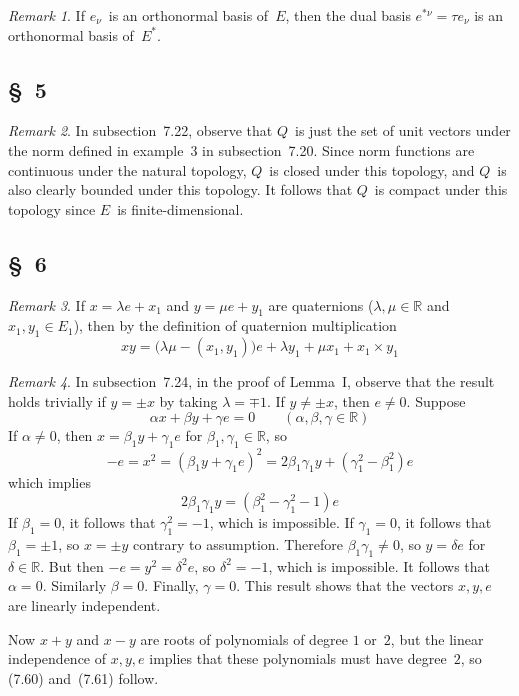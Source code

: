 \documentclass[letterpaper,12pt]{article}
\newcommand{\R}{\mathbb{R}}
\newcommand{\cross}{\times}
\newcommand{\iprod}[2]{(#1,#2)}
\theoremstyle{definition}
\theoremstyle{remark}
\newtheorem*{rmk}{Remark}
\begin{document}
\begin{rmk}
If \(e_{\nu}\)~is an orthonormal basis of~\(E\), then the dual basis \(e^{*\nu}=\tau e_{\nu}\) is an orthonormal basis of~\(E^*\).
\end{rmk}

\subsection*{\S~5}
\begin{rmk}
In subsection~7.22, observe that \(Q\)~is just the set of unit vectors under the norm defined in example~3 in subsection~7.20. Since norm functions are continuous under the natural topology, \(Q\)~is closed under this topology, and \(Q\)~is also clearly bounded under this topology. It follows that \(Q\)~is compact under this topology since \(E\)~is finite-dimensional.
\end{rmk}

\subsection*{\S~6}
\begin{rmk}
If \(x=\lambda e+x_1\) and \(y=\mu e+y_1\) are quaternions (\(\lambda,\mu\in\R\) and \(x_1,y_1\in E_1\)), then by the definition of quaternion multiplication
\[xy=\bigl(\lambda\mu-\iprod{x_1}{y_1}\bigr)e+\lambda y_1+\mu x_1+x_1\cross y_1\]
\end{rmk}

\begin{rmk}
In subsection~7.24, in the proof of Lemma~I, observe that the result holds trivially if \(y=\pm x\) by taking \(\lambda=\mp 1\). If \(y\ne\pm x\), then \(e\ne 0\). Suppose
\[\alpha x+\beta y+\gamma e=0\qquad(\alpha,\beta,\gamma\in\R)\]
If \(\alpha\ne 0\), then \(x=\beta_1y+\gamma_1e\) for \(\beta_1,\gamma_1\in\R\), so
\[-e=x^2=(\beta_1y+\gamma_1e)^2=2\beta_1\gamma_1y+(\gamma_1^2-\beta_1^2)e\]
which implies
\[2\beta_1\gamma_1y=(\beta_1^2-\gamma_1^2-1)e\]
If \(\beta_1=0\), it follows that \(\gamma_1^2=-1\), which is impossible. If \(\gamma_1=0\), it follows that \(\beta_1=\pm 1\), so \(x=\pm y\) contrary to assumption. Therefore \(\beta_1\gamma_1\ne 0\), so \(y=\delta e\) for \(\delta\in\R\). But then \(-e=y^2=\delta^2 e\), so \(\delta^2=-1\), which is impossible. It follows that \(\alpha=0\). Similarly \(\beta=0\). Finally, \(\gamma=0\). This result shows that the vectors \(x,y,e\) are linearly independent.

Now \(x+y\) and \(x-y\) are roots of polynomials of degree \(1\) or~\(2\), but the linear independence of \(x,y,e\) implies that these polynomials must have degree~\(2\), so (7.60) and~(7.61) follow.
\end{rmk}
\end{document}
